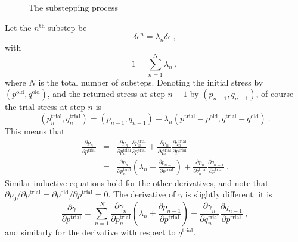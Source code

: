 \documentclass[]{scrreprt}
\begin{document}
\begin{figure}[htb]
\begin{center}
\caption{The substepping process}
\label{substep.fig}
\end{center}
\end{figure}

Let the $n^{\mathrm{th}}$ substep be
\begin{equation}
\delta\epsilon^{n} = \lambda_{n}\delta\epsilon \ ,
\end{equation}
with
\begin{equation}
1 = \sum_{n=1}^{N}\lambda_{n} \ ,
\end{equation}
where $N$ is the total number of substeps.  Denoting the initial
stress by $(p^{\mathrm{old}}, q^{\mathrm{old}})$, and the returned
stress at step $n-1$ by $(p_{n-1}, q_{n-1})$, of course the trial
stress at step $n$ is
\begin{equation}
(p_{n}^{\mathrm{trial}}, q_{n}^{\mathrm{trial}}) = (p_{n-1},q_{n-1}) +
  \lambda_{n} ( p^{\mathrm{trial}} - p^{\mathrm{old}},
    q^{\mathrm{trial}} - q^{\mathrm{old}}) \ .
\end{equation}
This means that
\begin{eqnarray}
\frac{\partial p_{n}}{\partial p^{\mathrm{trial}}} & = &
\frac{\partial p_{n}}{\partial p_{n}^{\mathrm{trial}}}
\frac{\partial p_{n}^{\mathrm{trial}}}{\partial p^{\mathrm{trial}}}
+ \frac{\partial p_{n}}{\partial q_{n}^{\mathrm{trial}}}
\frac{\partial q_{n}^{\mathrm{trial}}}{\partial p^{\mathrm{trial}}} \\
& = & \frac{\partial p_{n}}{\partial p_{n}^{\mathrm{trial}}}
\left(\lambda_{n} + \frac{\partial p_{n-1}}{\partial p^{\mathrm{trial}}}
\right)
+ \frac{\partial p_{n}}{\partial q_{n}^{\mathrm{trial}}}
\frac{\partial q_{n-1}}{\partial p^{\mathrm{trial}}} \ .
\end{eqnarray}
Similar inductive equations hold for the other derivatives, and note
that $\partial p_{0}/\partial p^{\mathrm{trial}} = \partial
p^{\mathrm{old}}/\partial p^{\mathrm{trial}} = 0$.  The derivative of
$\gamma$ is slightly different: it is
\begin{equation}
\frac{\partial \gamma}{\partial p^{\mathrm{trial}}} = \sum_{n=1}^{N}
\frac{\partial \gamma_{n}}{\partial p_{n}^{\mathrm{trial}}}
\left(\lambda_{n} + \frac{\partial p_{n-1}}{\partial p^{\mathrm{trial}}}
\right)
+ \frac{\partial \gamma_{n}}{\partial q_{n}^{\mathrm{trial}}}
\frac{\partial q_{n-1}}{\partial p^{\mathrm{trial}}} \ ,
\end{equation}
and similarly for the derivative with respect to $q^{\mathrm{trial}}$.
\end{document}
